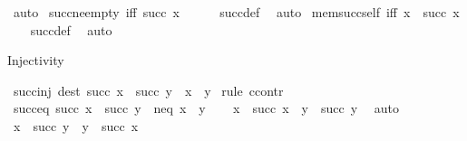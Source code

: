 \begin{isabellebody}
\ auto%
\endisatagproof
{\isafoldproof}%
%
\isadelimproof
\isanewline
%
\endisadelimproof
\isanewline
{}\isamarkupfalse%
\ succ{\isacharunderscore}{\kern0pt}ne{\isacharunderscore}{\kern0pt}empty\ {\isacharbrackleft}{\kern0pt}iff{\isacharbrackright}{\kern0pt}{\isacharcolon}{\kern0pt}\ {\isachardoublequoteopen}succ\ x\ {\isasymnoteq}\ {\isacharbraceleft}{\kern0pt}{\isacharbraceright}{\kern0pt}{\isachardoublequoteclose}\isanewline
%
\isadelimproof
\ \ %
\endisadelimproof
%
\isatagproof
{}\isamarkupfalse%
\ succ{\isacharunderscore}{\kern0pt}def\ \isamarkupfalse%
\ auto%
\endisatagproof
{\isafoldproof}%
%
\isadelimproof
\isanewline
%
\endisadelimproof
\isanewline
{}\isamarkupfalse%
\ mem{\isacharunderscore}{\kern0pt}succ{\isacharunderscore}{\kern0pt}self\ {\isacharbrackleft}{\kern0pt}iff{\isacharbrackright}{\kern0pt}{\isacharcolon}{\kern0pt}\ {\isachardoublequoteopen}x\ {\isasymin}\ succ\ x{\isachardoublequoteclose}\isanewline
%
\isadelimproof
\ \ %
\endisadelimproof
%
\isatagproof
{}\isamarkupfalse%
\ succ{\isacharunderscore}{\kern0pt}def\ \isamarkupfalse%
\ auto%
\endisatagproof
{\isafoldproof}%
%
\isadelimproof
%
\endisadelimproof
%
\begin{isamarkuptext}%
Injectivity%
\end{isamarkuptext}\isamarkuptrue%
\isamarkupfalse%
\ succ{\isacharunderscore}{\kern0pt}inj\ {\isacharbrackleft}{\kern0pt}dest{\isacharbrackright}{\kern0pt}{\isacharcolon}{\kern0pt}\ {\isachardoublequoteopen}succ\ x\ {\isacharequal}{\kern0pt}\ succ\ y\ {\isasymLongrightarrow}\ x\ {\isacharequal}{\kern0pt}\ y{\isachardoublequoteclose}\isanewline
%
\isadelimproof
%
\endisadelimproof
%
\isatagproof
{}\isamarkupfalse%
\ {\isacharparenleft}{\kern0pt}rule\ ccontr{\isacharparenright}{\kern0pt}\isanewline
\ \ \isamarkupfalse%
\ succ{\isacharunderscore}{\kern0pt}eq{\isacharcolon}{\kern0pt}\ {\isachardoublequoteopen}succ\ x\ {\isacharequal}{\kern0pt}\ succ\ y{\isachardoublequoteclose}\ \ neq{\isacharcolon}{\kern0pt}\ {\isachardoublequoteopen}x\ {\isasymnoteq}\ y{\isachardoublequoteclose}\isanewline
\ \ \isamarkupfalse%
\ {\isachardoublequoteopen}x\ {\isasymin}\ succ\ x{\isachardoublequoteclose}\ \ {\isachardoublequoteopen}y\ {\isasymin}\ succ\ y{\isachardoublequoteclose}\ \isamarkupfalse%
\ auto\isanewline
\ \ \isamarkupfalse%
\ \isamarkupfalse%
\ {\isachardoublequoteopen}x\ {\isasymin}\ succ\ y{\isachardoublequoteclose}\ \ {\isachardoublequoteopen}y\ {\isasymin}\ succ\ x{\isachardoublequoteclose}\ \isamarkupfalse%

\end{isabellebody}
